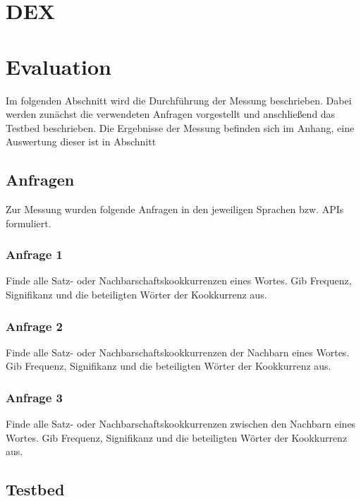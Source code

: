 \documentclass[11pt, a4paper, oneside]{article} %
\begin{document}
\section{DEX}

\section{Evaluation}

Im folgenden Abschnitt wird die Durchführung der Messung beschrieben. Dabei werden zunächst die verwendeten Anfragen vorgestellt und anschließend das Testbed beschrieben. Die Ergebnisse der Messung befinden sich im Anhang, eine Auswertung dieser ist in Abschnitt

\subsection{Anfragen}

Zur Messung wurden folgende Anfragen in den jeweiligen Sprachen bzw. APIs formuliert.

\subsubsection*{Anfrage 1}

Finde alle Satz- oder Nachbarschaftskookkurrenzen eines Wortes. Gib Frequenz, Signifikanz und die beteiligten Wörter der Kookkurrenz aus.

\subsubsection*{Anfrage 2}

Finde alle Satz- oder Nachbarschaftskookkurrenzen der Nachbarn eines Wortes. Gib Frequenz, Signifikanz und die beteiligten Wörter der Kookkurrenz aus.

\subsubsection*{Anfrage 3}

Finde alle Satz- oder Nachbarschaftskookkurrenzen zwischen den Nachbarn eines Wortes. Gib Frequenz, Signifikanz und die beteiligten Wörter der Kookkurrenz aus.

\subsection{Testbed}
\end{document}
